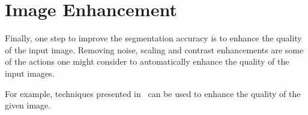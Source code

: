 \section{Image Enhancement}\label{sec:image-enhancement}
Finally, one step to improve the segmentation accuracy is to enhance the
quality of the input image. Removing noise, scaling and contrast enhancements
are some of the actions one might consider to automatically enhance the quality
of the input images.

For example, techniques presented in~\cite{Huang-CVPR-2015} can be used to
enhance the quality of the given image.
